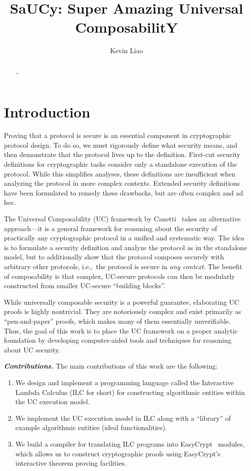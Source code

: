 \documentclass{llncs}
\title{SaUCy: Super Amazing Universal ComposabilitY}
\author{Kevin Liao}
\institute{}
\newcommand{\parheader}[1]{\noindent\emph{\textbf{{#1}.}}}
\begin{document}
\maketitle

\begin{abstract}
\ldots
\end{abstract}

\section{Introduction}

Proving that a protocol is secure is an essential component in cryptographic
protocol design. To do so, we must rigorously define what security means, and
then demonstrate that the protocol lives up to the definition. First-cut security
definitions for cryptographic tasks consider only a standalone execution of the
protocol. While this simplifies analyses, these definitions are insufficient
when analyzing the protocol in more complex contexts. Extended security
definitions have been formulated to remedy these drawbacks, but are often
complex and ad hoc.

The Universal Composability (UC) framework by
Canetti~\cite{canetti2001universally} takes an alternative approach---it is a
general framework for reasoning about the security of practically any
cryptographic protocol in a unified and systematic way. The idea is to formulate
a security definition and analyze the protocol as in the standalone model, but
to additionally show that the protocol composes securely with arbitrary other
protocols, i.e.,\ the protocol is secure in \emph{any context}. The benefit of
composability is that complex, UC-secure protocols can then be modularly
constructed from smaller UC-secure ``building blocks''.

While universally composable security is a powerful guarantee, elaborating UC
proofs is highly nontrivial. They are notoriously complex and exist primarily as
``pen-and-paper'' proofs, which makes many of them essentially
unverifiable. Thus, the goal of this work is to place the UC framework on a
proper analytic foundation by developing computer-aided tools and techniques for
reasoning about UC security.\smallskip

\parheader{Contributions} The main contributions of this work are the
following:
\begin{enumerate}
\item We design and implement a programming language called the Interactive
Lambda Calculus (ILC for short) for constructing algorithmic entities within the
UC execution model.
\item We implement the UC execution model in ILC along with a ``library'' of
example algorithmic entities (ideal functionalities).
\item We build a compiler for translating ILC programs into
EasyCrypt~\cite{barthe2011computer} modules, which allows us to construct
cryptographic proofs using EasyCrypt's interactive theorem proving facilities.
\end{enumerate}
\end{document}
